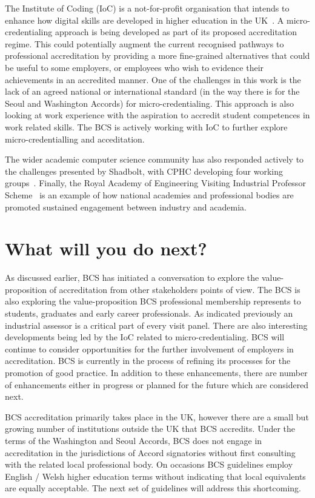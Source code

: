 \documentclass[sigconf]{acmart}
\begin{document}
The Institute of Coding (IoC) is a not-for-profit organisation that
intends to enhance how digital skills are developed in higher
education in the UK~\cite{Davenportetal2019a}. A micro-credentialing
approach is being developed as part of its proposed accreditation
regime. This could potentially augment the current recognised pathways
to professional accreditation by providing a more fine-grained
alternatives that could be useful to some employers, or employees who
wish to evidence their achievements in an accredited manner.  One of
the challenges in this work is the lack of an agreed national or
international standard (in the way there is for the Seoul and
Washington Accords) for micro-credentialing. This approach is also
looking at work experience with the aspiration to accredit student
competences in work related skills. The BCS is actively working with
IoC to further explore micro-credentialling and acceditation.

The wider academic computer science community has also responded
actively to the challenges presented by Shadbolt, with CPHC developing
four working groups~\cite{cphc_2016}.  Finally, the Royal Academy of
Engineering Visiting Industrial Professor Scheme~\cite{royal} is an
example of how national academies and professional bodies are promoted
sustained engagement between industry and academia.

\section {What will you do next?}	
As discussed earlier, BCS has initiated a conversation to explore the
value-proposition of accreditation from other stakeholders points of
view. The BCS is also exploring the value-proposition BCS professional
membership
represents to students, graduates and early career professionals. As
indicated previously an industrial assessor is a critical part of
every visit panel. There are also interesting developments being led
by the IoC related to micro-credentialing. BCS will continue to
consider opportunities for the further involvement of employers in
accreditation. BCS is currently in the process of refining its
processes for the promotion of good practice. In addition to these
enhancements, there are number of enhancements either in progress or
planned for the future which are considered next.

BCS accreditation primarily takes place in the UK, however there are a small but growing number of institutions outside the UK that BCS accredits. Under the terms of the Washington and Seoul Accords, BCS does not engage in accreditation in the jurisdictions of Accord signatories without first consulting with the related local professional body.  On occasions BCS guidelines employ English / Welsh higher education terms without indicating that local equivalents are equally acceptable. The next set of guidelines will address this shortcoming.
\end{document}
